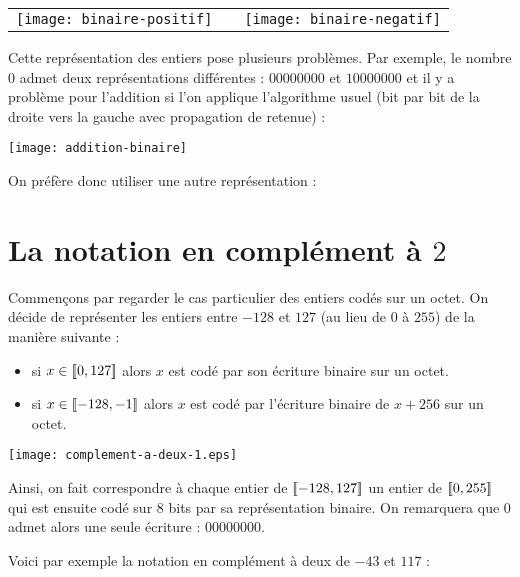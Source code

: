 \medskip


\begin{center}
\begin{tabular}{ccc}
\texttt{[image: binaire-positif]} & & \texttt{[image: binaire-negatif]} \\
\end{tabular}
\end{center}

Cette représentation des entiers pose plusieurs problèmes. Par exemple, le nombre $0$ admet deux représentations différentes : $00000000$ et $10000000$ et il y a problème pour l'addition si l'on applique l'algorithme usuel (bit par bit de la droite vers la gauche avec propagation de retenue) :

\begin{center}
\texttt{[image: addition-binaire]}
\end{center}

On préfère donc utiliser une autre représentation :

\section{La notation en complément à $2$}

Commençons par regarder le cas particulier des entiers codés sur un octet. On décide de représenter les entiers entre $-128$ et $127$ (au lieu de $0$ à $255$) de la manière suivante :

\begin{itemize}

\item si $x \in [\![ 0 , 127 ]\!]$ alors $x$ est codé par son écriture binaire sur un octet.

\item si $x \in [\![ -128 , -1 ]\!]$ alors $x$ est codé par l'écriture binaire de $x+256$ sur un octet.

\end{itemize}


\begin{center}
\texttt{[image: complement-a-deux-1.eps]} 
\end{center}

Ainsi, on fait correspondre à chaque entier de $[\![ -128 , 127 ]\!]$ un entier de $[\![ 0 , 255 ]\!]$ qui est ensuite codé sur $8$ bits par sa représentation binaire. On remarquera que $0$ admet alors une seule écriture : $00000000$.

 Voici par exemple la notation en complément à deux de $-43$ et $117$ :

